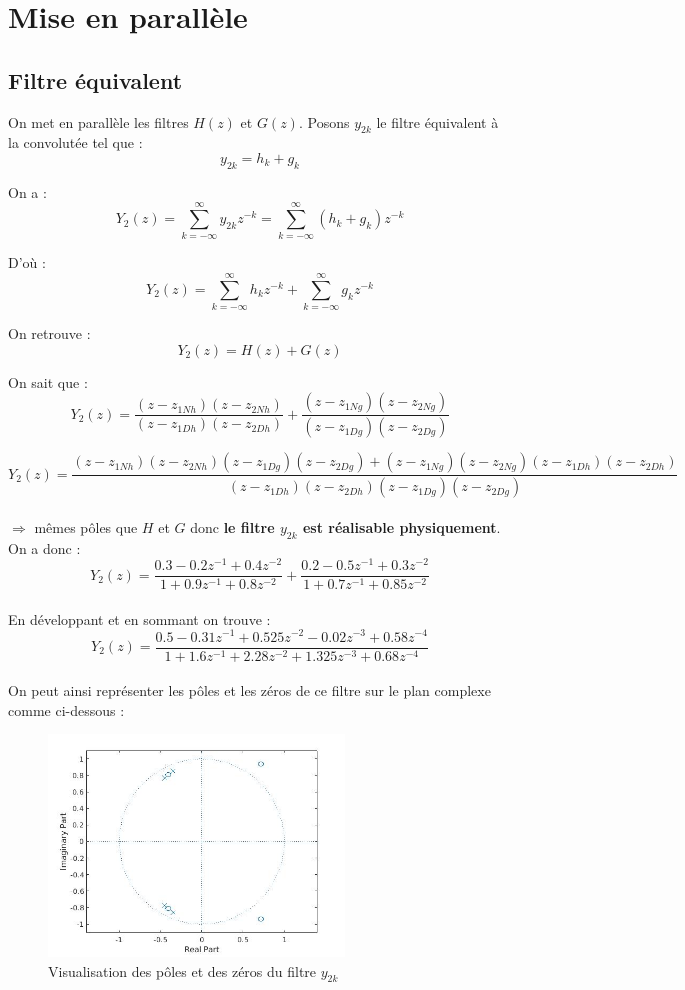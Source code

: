 \documentclass[12,french]{report}
\begin{document}
\chapter{Mise en parallèle}

\section{Filtre équivalent}

On met en parallèle les filtres $H(z)$ et $G(z)$. Posons $y_{2k}$ le filtre équivalent à la convolutée tel que : 
$$y_{2k}=h_k+g_k$$

On a :
$$ Y_2(z)=\sum_{k=-\infty}^{\infty}y_{2k}z^{-k}=\sum_{k=-\infty}^{\infty}(h_k+g_k)z^{-k} $$

D'où :
$$ Y_2(z)=\sum_{k=-\infty}^{\infty}h_kz^{-k}+\sum_{k=-\infty}^{\infty}g_kz^{-k} $$

On retrouve :
$$ Y_2(z)=H(z)+G(z)$$

On sait que :
$$ Y_2(z)= \frac{(z-z_{1Nh})(z-z_{2Nh})}{(z-z_{1Dh})(z-z_{2Dh})}+\frac{(z-z_{1Ng})(z-z_{2Ng})}{(z-z_{1Dg})(z-z_{2Dg})} $$

$$ Y_2(z)= \frac{(z-z_{1Nh})(z-z_{2Nh})(z-z_{1Dg})(z-z_{2Dg})+(z-z_{1Ng})(z-z_{2Ng})(z-z_{1Dh})(z-z_{2Dh})}{(z-z_{1Dh})(z-z_{2Dh})(z-z_{1Dg})(z-z_{2Dg})} $$\\
$\Longrightarrow$ mêmes pôles que $H$ et $G$ donc \textbf{le filtre $y_{2k}$ est réalisable physiquement}.\\


On a donc :\\
$$Y_2(z)=\frac{0.3-0.2z^{-1}+0.4z^{-2}}{1+0.9z^{-1}+0.8z^{-2}}+\frac{0.2-0.5z^{-1}+0.3z^{-2}}{1+0.7z^{-1}+0.85z^{-2}} $$\\

En développant et en sommant on trouve :
$$Y_2(z)=\frac{0.5-0.31z^{-1}+0.525z^{-2}-0.02z^{-3}+0.58z^{-4}}{1+1.6z^{-1}+2.28z^{-2}+1.325z^{-3}+0.68z^{-4}} $$\\

On peut ainsi représenter les pôles et les zéros de ce filtre sur le plan complexe comme ci-dessous :

\begin{figure}[H]
	\center
	\includegraphics[width=0.7\textwidth]{./Images/zplane_Y2}
	\caption{Visualisation des pôles et des zéros du filtre $y_{2k}$}
\end{figure}\vspace{0.2cm}
\end{document}
